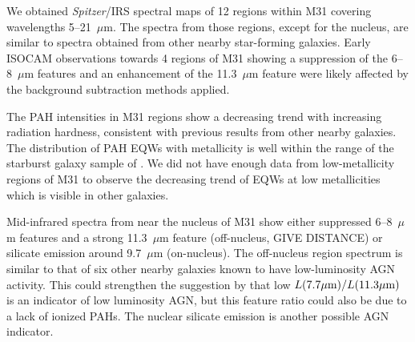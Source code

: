 We  obtained {\em Spitzer}/IRS spectral maps of 12 regions within M31 covering wavelengths 5--21~$\mu$m. 
The spectra from those regions, except for the nucleus, are similar to spectra obtained from other nearby  star-forming galaxies. 
Early  ISOCAM observations  towards 4 regions of M31 showing a suppression 
of the 6--8~$\mu$m features and an enhancement of  the 11.3~$\mu$m feature  \citep{1998Cesarsky} 
were likely affected by the background subtraction methods applied.

The PAH intensities in M31 regions show a decreasing trend with increasing radiation hardness, consistent with previous 
results from other nearby galaxies. The distribution of PAH EQWs with metallicity is well within the range of the starburst galaxy sample of \citet{Engelbracht_2008}. 
We did not have enough data from low-metallicity regions of M31 to observe the decreasing trend of EQWs at low metallicities which is visible in other galaxies.

Mid-infrared spectra from near the nucleus of M31 show either suppressed 6--8~$\mu$m features and a strong 11.3~$\mu$m feature
(off-nucleus, GIVE DISTANCE) or silicate emission around 9.7~$\mu$m  (on-nucleus). 
The off-nucleus region spectrum is similar to that of six other nearby galaxies known to have low-luminosity AGN activity. This could strengthen the
suggestion by \citet{Smith:2007lr} that low $L(7.7\mu{\rm m})/L(11.3\mu{\rm m})$ is an indicator of low luminosity AGN,
but this feature ratio could also be due to a lack of ionized PAHs. The nuclear silicate emission is another possible AGN indicator. 
 